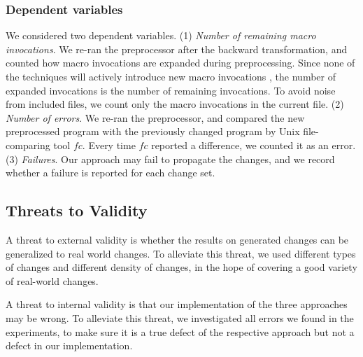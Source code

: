 \subsubsection{Dependent variables}
We considered two dependent variables. (1) \emph{Number of remaining
  macro invocations}. We re-ran the preprocessor after the backward
transformation, and counted how macro invocations are expanded during
preprocessing. Since none of the techniques will actively introduce
new macro invocations%
, the
number of expanded invocations is the number of remaining invocations.
To avoid noise from included files, we count only the macro
invocations in the current file.
(2) \emph{Number of errors}. We re-ran the preprocessor, and compared
the new preprocessed program with the previously changed program by
Unix file-comparing tool $fc$. Every time $fc$ reported a difference,
we counted it as an error. (3) \emph{Failures}. Our approach may fail
to propagate the changes, and we record whether a failure is reported
for each change set.

\subsection{Threats to Validity}
A threat to external validity is whether the results on generated
changes can be generalized to real world changes. To alleviate this
threat, we used different types of changes and different density of
changes, in the hope of covering a good variety of real-world changes.

A threat to internal validity is that our implementation of the three
approaches may be wrong. To alleviate this threat, we investigated all
errors we found in the experiments, to make sure it is a true defect
of the respective approach but not a defect in our implementation.

